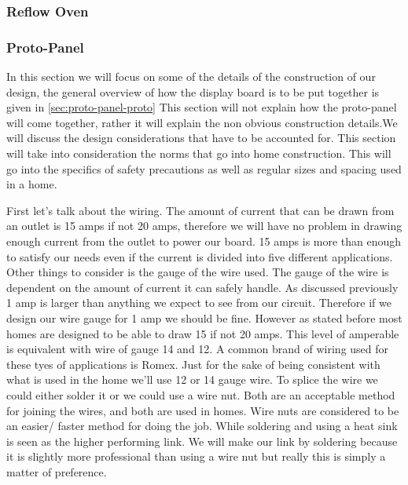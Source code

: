 \subsubsection{Reflow Oven}

\subsubsection{Proto-Panel}
\label{sec:proto-panel}
In this section we will focus on some of the details of the construction of our
design, the general overview of how the display board is to be put together is
given in \autoref{sec:proto-panel-proto} This section will not explain how the
proto{}-panel will come together, rather it will explain the non obvious
construction details.We will discuss the design considerations that have to be
accounted for. This section will take into consideration the norms that go into
home construction. This will go into the specifics of safety precautions as
well as regular sizes and spacing used in a home.

First let{}'s talk about the wiring. The amount of current that can be drawn
from an outlet is 15 amps if not 20 amps, therefore we will have no problem in
drawing enough current from the outlet to power our board. 15 amps is more than
enough to satisfy our needs even if the current is divided into five different
applications. Other things to consider is the gauge of the wire used. The gauge
of the wire is dependent on the amount of current it can safely handle. As
discussed previously 1 amp is larger than anything we expect to see from our
circuit. Therefore if we design our wire gauge for 1 amp we should be fine.
However as stated before most homes are designed to be able to draw 15 if not
20 amps. This level of amperable is equivalent with wire of gauge 14 and 12. A
common brand of wiring used for these tyes of applications is Romex. Just for
the sake of being consistent with what is used in the home we{}'ll use 12 or 14
gauge wire. To splice the wire we could either solder it or we could use a wire
nut. Both are an acceptable method for joining the wires, and both are used in
homes. Wire nuts are considered to be an easier/ faster method for doing the
job. While soldering and using a heat sink is seen as the higher performing
link. We will make our link by soldering because it is slightly more
professional than using a wire nut but really this is simply a matter of
preference.

